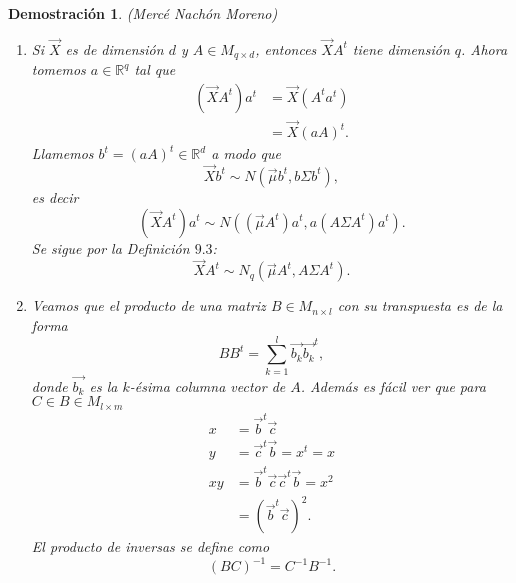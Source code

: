 \documentclass{article}
\newtheorem*{demo}{Demostración}
\newcommand{\R}{\mathbb{R}}
\begin{document}

\medskip
\begin{demo}
(Mercé Nachón Moreno)
\begin{enumerate}
    \item[(a)] Si $\Vec{X}$ es de dimensión $d$ y $A\in M_{q\times d}$, entonces $\Vec{X}A^t$ tiene dimensión $q$. Ahora tomemos $a\in\R^q$ tal que
    \begin{align*}
        (\Vec{X}A^t)a^t &= \Vec{X}(A^ta^t) \\
                        &= \Vec{X}(a A)^t.
    \end{align*}
    Llamemos $b^t = (a A)^t \in \R^d$ a modo que
    \[  \Vec{X}b^t \sim N(\Vec{\mu}b^t, b\Sigma b^t),   \]
    es decir
    \[  (\Vec{X}A^t)a^t \sim N((\Vec{\mu}A^t)a^t, a(A\Sigma A^t)a^t).  \]
    Se sigue por la Definición $9.3$:
    \[ \Vec{X}A^t \sim N_q(\Vec{\mu}A^t, A\Sigma A^t).  \]
    
    \newpage
    \item[(b)] Veamos que el producto de una matriz $B \in M_{n\times l}$ con su transpuesta es de la forma
    \begin{equation}
        BB^t = \sum_{k=1}^l \Vec{b_k}\Vec{b_k}^t,
    \end{equation}
    donde $\Vec{b_k}$ es la $k$-ésima columna vector de $A$. Además es fácil ver que para $C \in B \in M_{l\times m}$
    \begin{align*}
        x &= \Vec{b}^t\Vec{c} \\
        y &= \Vec{c}^t\Vec{b} = x^t = x \\
        xy &= \Vec{b}^t\Vec{c}\Vec{c}^t\Vec{b} = x^2 \\
        &= \left(\Vec{b}^t\Vec{c}\right)^2 .
    \end{align*}
    El producto de inversas se define como
    \[(BC)^{-1} = C^{-1}B^{-1}.\]
    

\end{enumerate}
\end{demo}
\end{document}
